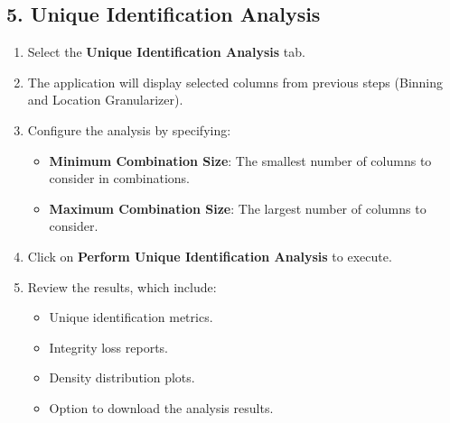 \documentclass[12pt,a4paper]{article}
\begin{document}
\subsection{5. Unique Identification Analysis}
\label{sec:unique_identification}
\begin{enumerate}
    \item Select the \textbf{Unique Identification Analysis} tab.
    \item The application will display selected columns from previous steps (Binning and Location Granularizer).
    \item Configure the analysis by specifying:
    \begin{itemize}
        \item \textbf{Minimum Combination Size}: The smallest number of columns to consider in combinations.
        \item \textbf{Maximum Combination Size}: The largest number of columns to consider.
    \end{itemize}
    \item Click on \textbf{Perform Unique Identification Analysis} to execute.
    \item Review the results, which include:
    \begin{itemize}
        \item Unique identification metrics.
        \item Integrity loss reports.
        \item Density distribution plots.
        \item Option to download the analysis results.
    \end{itemize}
\end{enumerate}
\end{document}
